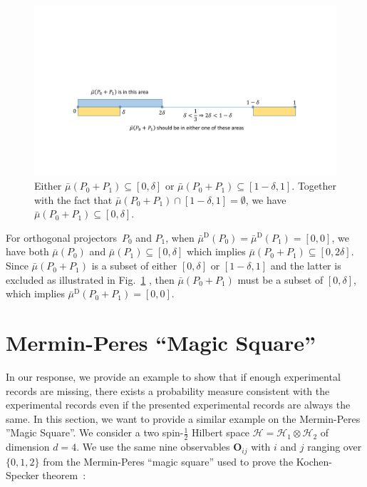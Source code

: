 \documentclass[english,reprint, aps, prl,superscriptaddress, showpacs,
showkeys, longbibliography, amsmath, amssymb, floatfix]{revtex4-1}
\theoremstyle{plain}
\theoremstyle{definition}
\newcommand{\Hilb}{\mathcal{H}}
\newcommand{\imposs}{\ensuremath{\left[0,0\right]}}
\begin{document}
\begin{figure}
\includegraphics[bb=50bp 100bp 900bp 300bp,clip,scale=0.5]{prop_prop_letter_ajhs_referee_response_pptx}\caption{\label{fig:Show-subset}Either $\bar{\mu}\left(P_{0}+P_{1}\right)\subseteq\left[0,\delta\right]$
or $\bar{\mu}\left(P_{0}+P_{1}\right)\subseteq\left[1-\delta,1\right]$.
Together with the fact that $\bar{\mu}\left(P_{0}+P_{1}\right)\cap\left[1-\delta,1\right]=\emptyset$,
we have $\bar{\mu}\left(P_{0}+P_{1}\right)\subseteq\left[0,\delta\right]$.}
\end{figure}
For orthogonal projectors~$P_{0}$ and $P_{1}$, when $\bar{\mu}^{\textrm{D}}\left(P_{0}\right)=\bar{\mu}^{\textrm{D}}\left(P_{1}\right)=\imposs$,
we have both $\bar{\mu}\left(P_{0}\right)$ and $\bar{\mu}\left(P_{1}\right)\subseteq\left[0,\delta\right]$
which implies $\bar{\mu}\left(P_{0}+P_{1}\right)\subseteq\left[0,2\delta\right]$.
Since $\bar{\mu}\left(P_{0}+P_{1}\right)$ is a subset of either $\left[0,\delta\right]$
or $\left[1-\delta,1\right]$ and the latter is excluded as illustrated
in Fig.~\ref{fig:Show-subset} , then $\bar{\mu}\left(P_{0}+P_{1}\right)$
must be a subset of $\left[0,\delta\right]$, which implies $\bar{\mu}^{\textrm{D}}\left(P_{0}+P_{1}\right)=\imposs$.

\section{Mermin-Peres ``Magic Square''}

In our response, we provide an example to show that if enough experimental
records are missing, there exists a probability measure consistent
with the experimental records even if the presented experimental records
are always the same. In this section, we want to provide a similar
example on the Mermin-Peres ''Magic Square''. We consider a two
spin-$\frac{1}{2}$ Hilbert space $\Hilb=\Hilb_{1}\otimes\Hilb_{2}$
of dimension $d=4$. We use the same nine observables $\mathbf{O}_{ij}$
with $i$ and $j$ ranging over $\{0,1,2\}$ from the Mermin-Peres
``magic square'' used to prove the Kochen-Specker theorem~\cite{Mermin1990Simple,peres1995quantum,Griffiths2003}:
\end{document}
